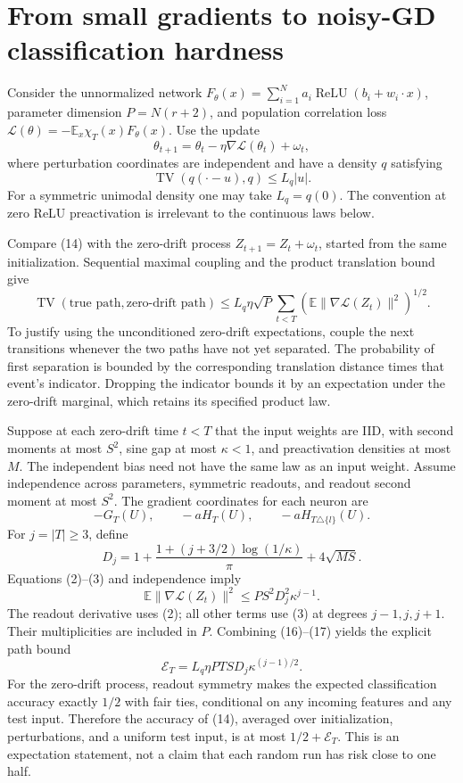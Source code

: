 \documentclass[11pt]{article}
\newcommand{\E}{\mathbb E}\newcommand{\R}{\mathbb R}
\newcommand{\relu}{\operatorname{ReLU}}
\begin{document}
\section{From small gradients to noisy-GD classification hardness}
Consider the unnormalized network
$F_\theta(x)=\sum_{i=1}^N a_i\relu(b_i+w_i\cdot x)$,
parameter dimension $P=N(r+2)$, and population correlation loss
$\mathcal L(\theta)=-\E_x\chi_T(x)F_\theta(x)$.
Use the update
\[
 \theta_{t+1}=\theta_t-\eta\nabla\mathcal L(\theta_t)+\omega_t,
 \tag{14}
\]
where perturbation coordinates are independent and have a density $q$
satisfying
\[
 \operatorname{TV}(q(\cdot-u),q)\le L_q|u|.            \tag{15}
\]
For a symmetric unimodal density one may take $L_q=q(0)$.
The convention at zero ReLU preactivation is irrelevant to the
continuous laws below.

Compare (14) with the zero-drift process $Z_{t+1}=Z_t+\omega_t$,
started from the same initialization. Sequential maximal coupling and
the product translation bound give
\[
 \operatorname{TV}(\text{true path},\text{zero-drift path})
 \le L_q\eta\sqrt P\sum_{t<T}
                 (\E\|\nabla\mathcal L(Z_t)\|^2)^{1/2}.
 \tag{16}
\]
To justify using the unconditioned zero-drift expectations, couple the
next transitions whenever the two paths have not yet separated.
The probability of first separation is bounded by the corresponding
translation distance times that event's indicator. Dropping the indicator
bounds it by an expectation under the zero-drift marginal, which retains
its specified product law.

Suppose at each zero-drift time $t<T$ that the input weights are IID,
with second moments at most $S^2$, sine gap at most $\kappa<1$, and
preactivation densities at most $M$. The independent bias need not have
the same law as an input weight. Assume independence across parameters,
symmetric readouts, and readout second moment at most $S^2$.
The gradient coordinates for each neuron are
\[
 -G_T(U),\qquad -aH_T(U),\qquad -aH_{T\triangle\{l\}}(U).
\]
For $j=|T|\ge3$, define
\[
 D_j=1+\frac{1+(j+3/2)\log(1/\kappa)}\pi+4\sqrt{MS}.
\]
Equations (2)--(3) and independence imply
\[
 \E\|\nabla\mathcal L(Z_t)\|^2
                         \le P S^2D_j^2\kappa^{j-1}.   \tag{17}
\]
The readout derivative uses (2); all other terms use (3) at degrees
$j-1,j,j+1$. Their multiplicities are included in $P$.
Combining (16)--(17) yields the explicit path bound
\[
                   \mathcal E_T=L_q\eta PTS D_j
                                             \kappa^{(j-1)/2}. \tag{18}
\]
For the zero-drift process, readout symmetry makes the expected
classification accuracy exactly $1/2$ with fair ties, conditional on
any incoming features and any test input. Therefore the accuracy of
(14), averaged over initialization, perturbations, and a uniform test
input, is at most $1/2+\mathcal E_T$.
This is an expectation statement, not a claim that each random run has
risk close to one half.
\end{document}
